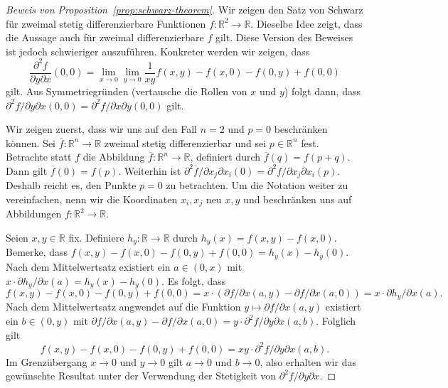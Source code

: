 \documentclass[../main.tex]{subfiles}
\begin{document}
\begin{proof}[Beweis von Proposition~\ref{prop:schwarz-theorem}]
  Wir zeigen den Satz von Schwarz für zweimal stetig differenzierbare
  Funktionen $f \colon \mathbb{R}^2 \to \mathbb{R}$.
  Dieselbe Idee zeigt, dass die Aussage auch für
  zweimal differenzierbare $f$ gilt. Diese Version des Beweises
  ist jedoch schwieriger auszuführen.
  Konkreter werden wir zeigen, dass
  \[
    \frac{\partial^2 f}{\partial y \partial x}(0, 0)
    =
    \lim_{x \to 0} \lim_{y \to 0} \frac{1}{xy}
    f(x, y) - f(x, 0) - f(0, y) + f(0, 0)
  \]
  gilt. Aus Symmetriegründen (vertausche die Rollen von $x$ und $y$)
  folgt dann, dass $\partial^2 f/ \partial y \partial x (0, 0)
  = \partial^2 f / \partial x \partial y (0, 0)$ gilt.

  Wir zeigen zuerst, dass wir uns auf den Fall $n = 2$
  und $p = 0$
  beschränken können. Sei $\overline f \colon \mathbb{R}^n \to \mathbb{R}$ 
  zweimal stetig differenzierbar und sei $p \in \mathbb{R}^n$ fest.
  Betrachte statt $f$ die Abbildung
  $\overline f \colon \mathbb{R}^n \to \mathbb{R}$,
  definiert durch $\overline f(q) = f(p + q)$.
  Dann gilt $\overline f ( 0) = f(p)$.
  Weiterhin ist $\partial^2 \overline f / \partial x_j \partial x_i (0)
  = \partial^2 f / \partial x_j \partial x_i (p)$.
  Deshalb reicht es, den Punkte $p = 0$ zu betrachten.
  Um die Notation weiter zu vereinfachen, nenn wir die Koordinaten
  $x_i, x_j$ neu $x, y$ und beschränken uns auf Abbildungen
  $f \colon \mathbb{R}^2 \to \mathbb{R}$.

  Seien $x, y \in \mathbb{R}$ fix.
  Definiere $h_y \colon \mathbb{R} \to \mathbb{R}$ durch
  $h_y(x) = f(x, y) - f(x, 0)$.
  Bemerke, dass
  $f(x, y) - f(x, 0) - f(0, y) + f(0, 0) = h_y(x) - h_y(0)$.
  Nach dem Mittelwertsatz existiert
  ein $a \in (0, x)$ mit $x \cdot \partial h_y / \partial x (a)
  = h_y(x) - h_y(0)$.
  Es folgt, dass
  \[
    f(x, y) - f(x, 0) - f(0, y) + f(0, 0) = x \cdot
    (\partial f/ \partial x ( a, y) - \partial f/ \partial x (a, 0))
    = x \cdot \partial h_y / \partial x (a).
  \]
  Nach dem Mittelwertsatz angwendet auf die Funktion
  $y \mapsto \partial f / \partial x (a, y)$
  existiert ein $b \in (0, y)$ mit 
  $\partial f / \partial x (a, y) - \partial f/ \partial x (a, 0) =
  y \cdot
  \partial^2 f/ \partial y \partial x (a, b)$.
  Folglich gilt
   \[
     f(x, y) - f(x, 0) - f(0, y) + f(0, 0) = xy \cdot \partial^2 f /
     \partial y \partial x (a, b).
  \]
  Im Grenzübergang  $x \to 0$ und $y \to 0$ gilt
  $a \to 0$ und $b \to 0$, also erhalten wir
  das gewünschte Resultat
  unter der Verwendung der Stetigkeit von
  $\partial^2 f / \partial y \partial x$.
\end{proof}
\end{document}
